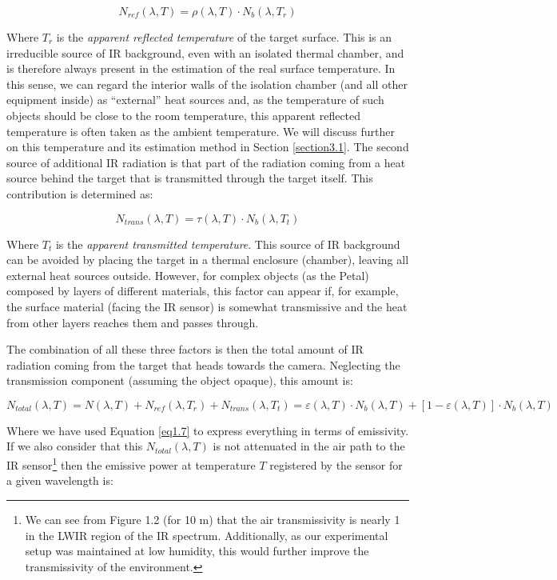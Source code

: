 		\begin{equation}\label{eq1.9}
			N_{ref}(\lambda,T)=\rho(\lambda,T) \cdot N_{b}(\lambda, T_{r})
		\end{equation}\bigskip
		
		Where $T_{r}$ is the \textit{apparent reflected temperature} of the target surface. This is an irreducible source of IR background, even with an isolated thermal chamber, and is therefore always present in the estimation of the real surface temperature. In this sense, we can regard the interior walls of the isolation chamber (and all other equipment inside) as “external” heat sources and, as the temperature of such objects should be close to the room temperature, this apparent reflected temperature is often taken as the ambient temperature. We will discuss further on this temperature and its estimation method in Section \ref{section3.1}. The second source of additional IR radiation is that part of the radiation coming from a heat source behind the target that is transmitted through the target itself. This contribution is determined as:
		
		\begin{equation}\label{eq1.10}
			N_{trans}(\lambda,T)=\tau(\lambda,T) \cdot N_{b}(\lambda, T_{t})
		\end{equation}\bigskip	
		
		Where $T_{t}$ is the \textit{apparent transmitted temperature}. This source of IR background can be avoided by placing the target in a thermal enclosure (chamber), leaving all external heat sources outside. However, for complex objects (as the Petal) composed by layers of different materials, this factor can appear if, for example, the surface material (facing the IR sensor) is somewhat transmissive and the heat from other layers reaches them and passes through.
		
		The combination of all these three factors is then the total amount of IR radiation coming from the target that heads towards the camera. Neglecting the transmission component (assuming the object opaque), this amount is:
		
		\begin{equation}\label{eq1.11}
			N_{total}(\lambda,T)=N(\lambda,T)+N_{ref}(\lambda,T_{r})+N_{trans}(\lambda,T_{t})=\varepsilon(\lambda,T) \cdot N_{b}(\lambda, T)+[1-\varepsilon(\lambda,T)] \cdot N_{b}(\lambda, T)
		\end{equation}\bigskip
		
		Where we have used Equation \ref{eq1.7} to express everything in terms of emissivity. If we also consider that this $N_{total}(\lambda,T)$ is not attenuated in the air path to the IR sensor\footnote{{\footnotesize We can see from Figure 1.2 (for 10 m) that the air transmissivity is nearly 1 in the LWIR region of the IR spectrum. Additionally, as our experimental setup was maintained at low humidity, this would further improve the transmissivity of the environment.}} then the emissive power at temperature $T$ registered by the sensor for a given wavelength is:
		
